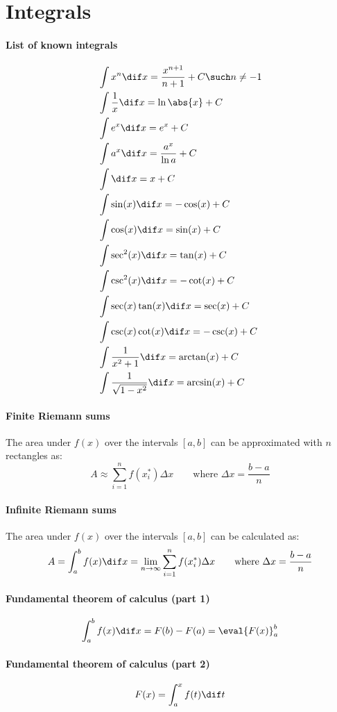 \section{Integrals}
\paragraph{List of known integrals}
	\begin{align}
		&\int x^n \dif x = \frac{x^{n+1}}{n+1} + C \such n \neq -1\\
		&\int \frac{1}{x} \dif x = \ln \abs{x} + C\\
		&\int e^x \dif x = e^x + C\\
		&\int a^x \dif x = \frac{a^x}{\ln a} + C\\
		&\int \dif x = x + C\\
		&\int \sin(x) \dif x = -\cos(x) + C\\
		&\int \cos(x) \dif x = \sin(x) + C\\
		&\int \sec^2(x) \dif x = \tan(x) + C\\
		&\int \csc^2(x) \dif x = -\cot(x) + C\\
		&\int \sec(x) \tan(x) \dif x = \sec(x) + C\\
		&\int \csc(x) \cot(x) \dif x = -\csc(x) + C\\
		&\int \frac{1}{x^2 + 1} \dif x = \arctan(x) + C\\
		&\int \frac{1}{\sqrt{1 - x^2}} \dif x = \arcsin(x) + C
	\end{align}
\paragraph{Finite Riemann sums}
	The area under $f(x)$ over the intervals $[a,b]$ can be approximated with $n$ rectangles as:
	\begin{equation}
		A \approx \sum_{i=1}^n f(x_i^*) \Delta x \qquad \text{where } \Delta x = \frac{b-a}{n}
	\end{equation}
\paragraph{Infinite Riemann sums}
	The area under $f(x)$ over the intervals $[a,b]$ can be calculated as:
	\begin{equation}
		A = \int_a^b f(x) \dif x = \lim_{n \to \infty} \sum_{i=1}^n f(x_i^*) \Delta x \qquad \text{where } \Delta x = \frac{b-a}{n}
	\end{equation}
\paragraph{Fundamental theorem of calculus (part 1)}
	\begin{equation}
		\int_a^b f(x) \dif x = F(b) - F(a) = \eval{F(x)}_a^b
	\end{equation}
\paragraph{Fundamental theorem of calculus (part 2)}
	\begin{equation}
		F(x) = \int_a^x f(t) \dif t
	\end{equation}
